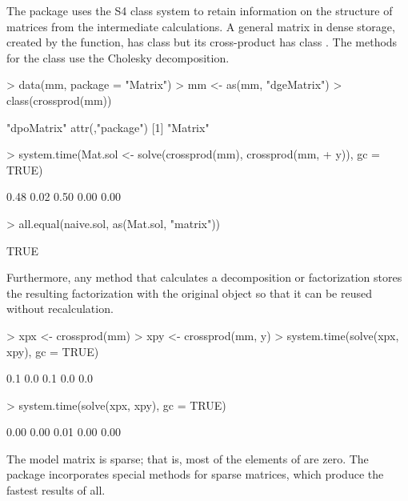 \documentclass{article}
\begin{document}
The  package uses the S4 class system
\citep{R:Chambers:1998} to retain information on the structure of
matrices from the intermediate calculations.  A general matrix in
dense storage, created by the  function, has class
 but its cross-product has class .
The  methods for the  class use the
Cholesky decomposition.
\begin{Schunk}
\begin{Sinput}
> data(mm, package = "Matrix")
> mm <- as(mm, "dgeMatrix")
> class(crossprod(mm))
\end{Sinput}
\begin{Soutput}
[1] "dpoMatrix"
attr(,"package")
[1] "Matrix"
\end{Soutput}
\begin{Sinput}
> system.time(Mat.sol <- solve(crossprod(mm), crossprod(mm, 
+     y)), gc = TRUE)
\end{Sinput}
\begin{Soutput}
[1] 0.48 0.02 0.50 0.00 0.00
\end{Soutput}
\begin{Sinput}
> all.equal(naive.sol, as(Mat.sol, "matrix"))
\end{Sinput}
\begin{Soutput}
[1] TRUE
\end{Soutput}
\end{Schunk}

Furthermore, any method that calculates a
decomposition or factorization stores the resulting factorization with
the original object so that it can be reused without recalculation.
\begin{Schunk}
\begin{Sinput}
> xpx <- crossprod(mm)
> xpy <- crossprod(mm, y)
> system.time(solve(xpx, xpy), gc = TRUE)
\end{Sinput}
\begin{Soutput}
[1] 0.1 0.0 0.1 0.0 0.0
\end{Soutput}
\begin{Sinput}
> system.time(solve(xpx, xpy), gc = TRUE)
\end{Sinput}
\begin{Soutput}
[1] 0.00 0.00 0.01 0.00 0.00
\end{Soutput}
\end{Schunk}

The model matrix  is sparse; that is, most of the elements of
 are zero.  The  package incorporates special
methods for sparse matrices, which produce the fastest results of all.
\end{document}
